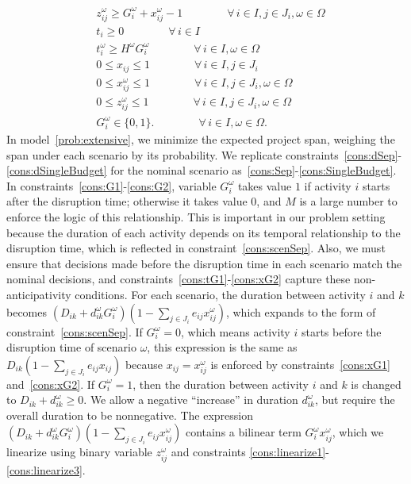 \documentclass[11pt]{article}
\begin{document}
\begin{subequations}
\begin{align}
			& z_{ij}^\omega \geq G_i^\omega + x_{ij}^\omega - 1 \qquad \qquad \forall \,i \in I, j \in J_i, \omega \in \Omega \label{cons:linearize3}\\
			& t_i \geq 0 \qquad \qquad \forall \,i \in I \label{cons:nonnegt}\\
			& t_i^\omega \geq H^\omega G_i^\omega \qquad \qquad \forall\, i \in I, \omega \in \Omega \label{cons:extra} \\
			& 0 \leq x_{ij} \leq 1 \qquad \qquad \forall \,i \in I, j \in J_i\\ 
			& 0 \leq x_{ij}^\omega \leq 1 \qquad \qquad \forall \,i \in I, j \in J_i, \omega \in \Omega\\
			& 0 \leq z_{ij}^\omega \leq 1 \qquad \qquad \forall \,i \in I, j \in J_i, \omega \in \Omega\\
			& G_i^\omega \in \{0,1\}. \qquad \qquad \forall \,i \in I, \omega \in \Omega.
			\end{align}
		\end{subequations}
		In model~\eqref{prob:extensive}, we minimize the expected project span, weighing the span under each scenario by its probability. We replicate constraints~\eqref{cons:dSep}-\eqref{cons:dSingleBudget} for the nominal scenario as~\eqref{cons:Sep}-\eqref{cons:SingleBudget}. In constraints~\eqref{cons:G1}-\eqref{cons:G2}, variable \(G^\omega_i\) takes value \(1\) if activity \(i\) starts after the disruption time; otherwise it takes value 0, and \(M\) is a large number to enforce the logic of this relationship. This is important in our problem setting because the duration of each activity depends on its temporal relationship to the disruption time, which is reflected in constraint~\eqref{cons:scenSep}. Also, we must ensure that decisions made before the disruption time in each scenario match the nominal decisions, and constraints~\eqref{cons:tG1}-\eqref{cons:xG2} capture these non-anticipativity conditions. For each scenario, the duration between activity \(i\) and \(k\) becomes \((D_{ik} + d_{ik}^\omega G_i^\omega)(1 - \sum_{j \in J_i} e_{ij}x_{ij}^\omega)\), which expands to the form of constraint~\eqref{cons:scenSep}. If \(G_i^\omega = 0\), which means activity \(i\) starts before the disruption time of scenario \(\omega\), this expression is the same as \(D_{ik} (1 - \sum_{j \in J_i} e_{ij}x_{ij})\) because \(x_{ij} = x_{ij}^\omega\) is enforced by constraints~\eqref{cons:xG1} and~\eqref{cons:xG2}. If \(G_i^\omega = 1\), then the duration between activity \(i\) and \(k\) is changed to \(D_{ik} + d_{ik}^\omega \ge 0\). We allow a negative ``increase'' in duration $d_{ik}^\omega$, but require the overall duration to be nonnegative. The expression \((D_{ik} + d_{ik}^\omega G_i^\omega)(1 - \sum_{j \in J_i} e_{ij}x_{ij}^\omega)\) contains a bilinear term \(G_i^\omega x_{ij}^\omega\), which we linearize using binary variable \(z_{ij}^\omega\) and constraints \eqref{cons:linearize1}-\eqref{cons:linearize3}.
	
\end{document}
